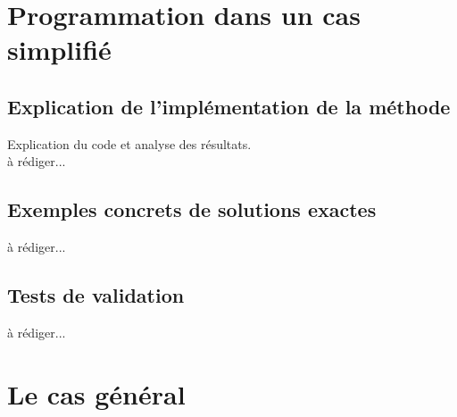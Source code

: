 \documentclass[12pt]{article}
\begin{document}
 
 
\section{Programmation dans un cas simplifié}

\subsection{Explication de l'implémentation de la méthode}

\noindent Explication du code et analyse des résultats.
\\à rédiger...


\subsection{Exemples concrets de solutions exactes}
à rédiger...


\subsection{Tests de validation}
à rédiger...

\section{Le cas général}
\end{document}
